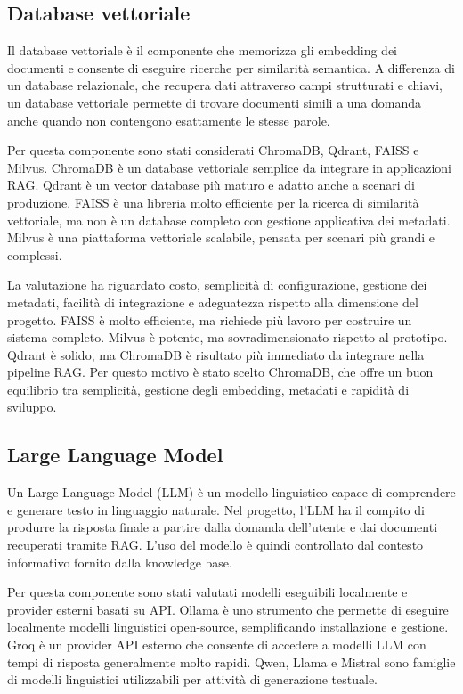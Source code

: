 \subsection*{Database vettoriale}

Il database vettoriale è il componente che memorizza gli embedding dei documenti e consente di eseguire ricerche per similarità semantica. A differenza di un database relazionale, che recupera dati attraverso campi strutturati e chiavi, un database vettoriale permette di trovare documenti simili a una domanda anche quando non contengono esattamente le stesse parole.

Per questa componente sono stati considerati ChromaDB, Qdrant, FAISS e Milvus. ChromaDB è un database vettoriale semplice da integrare in applicazioni RAG. Qdrant è un vector database più maturo e adatto anche a scenari di produzione. FAISS è una libreria molto efficiente per la ricerca di similarità vettoriale, ma non è un database completo con gestione applicativa dei metadati. Milvus è una piattaforma vettoriale scalabile, pensata per scenari più grandi e complessi.

La valutazione ha riguardato costo, semplicità di configurazione, gestione dei metadati, facilità di integrazione e adeguatezza rispetto alla dimensione del progetto. FAISS è molto efficiente, ma richiede più lavoro per costruire un sistema completo. Milvus è potente, ma sovradimensionato rispetto al prototipo. Qdrant è solido, ma ChromaDB è risultato più immediato da integrare nella pipeline RAG. Per questo motivo è stato scelto ChromaDB, che offre un buon equilibrio tra semplicità, gestione degli embedding, metadati e rapidità di sviluppo.

\subsection*{Large Language Model}

Un Large Language Model (LLM) è un modello linguistico capace di comprendere e generare testo in linguaggio naturale. Nel progetto, l’LLM ha il compito di produrre la risposta finale a partire dalla domanda dell’utente e dai documenti recuperati tramite RAG. L’uso del modello è quindi controllato dal contesto informativo fornito dalla knowledge base.

Per questa componente sono stati valutati modelli eseguibili localmente e provider esterni basati su API. Ollama è uno strumento che permette di eseguire localmente modelli linguistici open-source, semplificando installazione e gestione. Groq è un provider API esterno che consente di accedere a modelli LLM con tempi di risposta generalmente molto rapidi. Qwen, Llama e Mistral sono famiglie di modelli linguistici utilizzabili per attività di generazione testuale.

